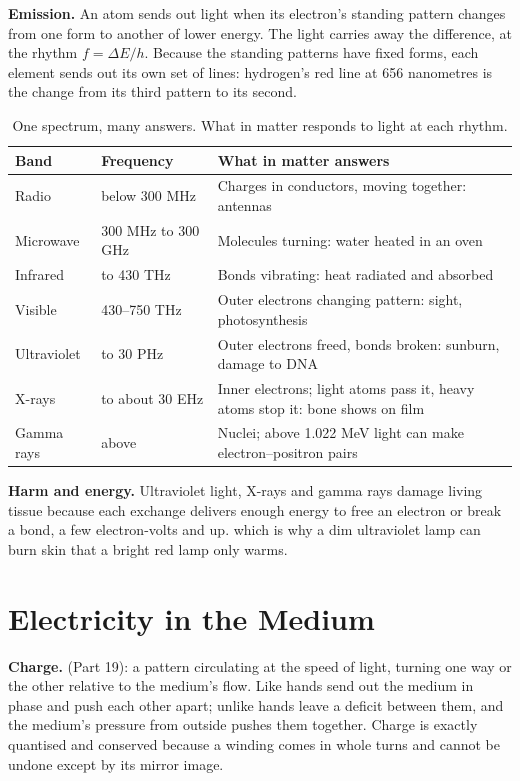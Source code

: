 \documentclass[11pt,a4paper]{article}
\begin{document}
\textbf{Emission.} An atom sends out light when its electron's standing pattern changes from one form to another of lower energy. The light carries away the difference, at the rhythm $f = \Delta E/h$. Because the standing patterns have fixed forms, each element sends out its own set of lines: hydrogen's red line at 656 nanometres is the change from its third pattern to its second.

\begin{table}[h]\centering\small
\caption{One spectrum, many answers. What in matter responds to light at each rhythm.}
\begin{tabularx}{\linewidth}{@{}l l X@{}}\toprule
\textbf{Band} & \textbf{Frequency} & \textbf{What in matter answers}\\\midrule
Radio & below 300 MHz & Charges in conductors, moving together: antennas\\
Microwave & 300 MHz to 300 GHz & Molecules turning: water heated in an oven\\
Infrared & to 430 THz & Bonds vibrating: heat radiated and absorbed\\
Visible & 430--750 THz & Outer electrons changing pattern: sight, photosynthesis\\
Ultraviolet & to 30 PHz & Outer electrons freed, bonds broken: sunburn, damage to DNA\\
X-rays & to about 30 EHz & Inner electrons; light atoms pass it, heavy atoms stop it: bone shows on film\\
Gamma rays & above & Nuclei; above 1.022 MeV light can make electron--positron pairs\\\bottomrule
\end{tabularx}\label{tab:spectrum}\end{table}

\textbf{Harm and energy.} Ultraviolet light, X-rays and gamma rays damage living tissue because each exchange delivers enough energy to free an electron or break a bond, a few electron-volts and up.  which is why a dim ultraviolet lamp can burn skin that a bright red lamp only warms.

\section{Electricity in the Medium}

\textbf{Charge.}  (Part 19): a pattern circulating at the speed of light, turning one way or the other relative to the medium's flow. Like hands send out the medium in phase and push each other apart; unlike hands leave a deficit between them, and the medium's pressure from outside pushes them together. Charge is exactly quantised and conserved because a winding comes in whole turns and cannot be undone except by its mirror image.
\end{document}
